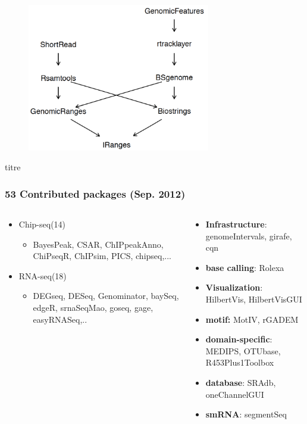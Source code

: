 \documentclass[xcolor=dvipsnames]{beamer}
\begin{document}
       \begin{frame}
     \frametitle{}
     \begin{figure}[ht]
\centering
\includegraphics[width=80mm]{diagramas/Seleccio_001.png}
\end{figure}
     \end{frame}
    
       
     
      \begin{frame}{titre}
      \frametitle{53 Contributed packages (Sep. 2012)}
  \begin{columns}%
  
  
    \begin{column}[t]{0.45\textwidth}%
     \begin{itemize}
     \item Chip-seq(14)
      \begin{itemize}
        \item BayesPeak, CSAR, ChIPpeakAnno, ChiPseqR, ChIPsim, PICS, chipseq,...\\   
      \end{itemize}
     \item RNA-seq(18)
       \begin{itemize}
       \item DEGseq, DESeq, Genominator, baySeq, edgeR, srnaSeqMao, goseq, gage, easyRNASeq,..
      \end{itemize}
      \end{itemize}
    \end{column}
    
   
    \begin{column}[t]{0.45\textwidth}%
      \begin{itemize}
      \item \textbf{Infrastructure}: genomeIntervals, girafe, cqn
        \item \textbf{base calling}: Rolexa
        \item \textbf{Visualization}: HilbertVis, HilbertVisGUI
        \item \textbf{motif:} MotIV, rGADEM
        \item \textbf{domain-specific}: MEDIPS, OTUbase, R453Plus1Toolbox
        \item \textbf{database}: SRAdb, oneChannelGUI
        \item \textbf{smRNA}: segmentSeq
      \end{itemize}
    \end{column}
  \end{columns}
\end{frame}
\end{document}
